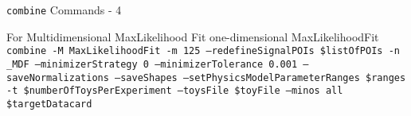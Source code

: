 \begin{frame}{\texttt{combine} Commands - 4}
\begin{block}{For Multidimensional MaxLikelihood Fit}
\hypertarget{MDML}{one-dimensional MaxLikelihoodFit}
\texttt{combine -M MaxLikelihoodFit -m 125 --redefineSignalPOIs \$listOfPOIs -n \_MDF --minimizerStrategy 0 --minimizerTolerance 0.001 --saveNormalizations --saveShapes --setPhysicsModelParameterRanges \$ranges -t \$numberOfToysPerExperiment --toysFile \$toyFile --minos all \$targetDatacard}
\end{block}

\end{frame}


%
%
%
%
%
%
%
%
